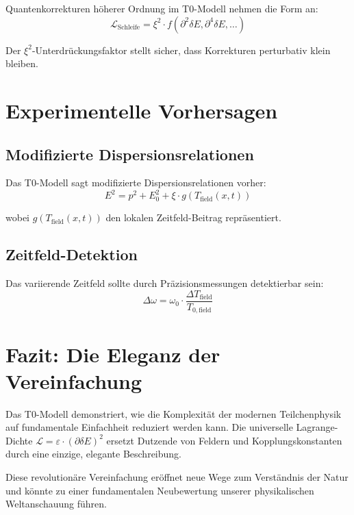 \documentclass[12pt,a4paper]{report}
\begin{document}
	Quantenkorrekturen höherer Ordnung im T0-Modell nehmen die Form an:
	\begin{equation}
		\mathcal{L}_{\text{Schleife}} = \xi^2 \cdot f(\partial^2\delta E, \partial^4\delta E, \ldots)
	\end{equation}
	
	Der $\xi^2$-Unterdrückungsfaktor stellt sicher, dass Korrekturen perturbativ klein bleiben.
	
	\section{Experimentelle Vorhersagen}
	
	\subsection{Modifizierte Dispersionsrelationen}
	
	Das T0-Modell sagt modifizierte Dispersionsrelationen vorher:
	\begin{equation}
		E^2 = p^2 + E_0^2 + \xi \cdot g(T_{\text{field}}(x,t))
	\end{equation}
	
	wobei $g(T_{\text{field}}(x,t))$ den lokalen Zeitfeld-Beitrag repräsentiert.
	
	\subsection{Zeitfeld-Detektion}
	
	Das variierende Zeitfeld sollte durch Präzisionsmessungen detektierbar sein:
	\begin{equation}
		\Delta\omega = \omega_0 \cdot \frac{\Delta T_{\text{field}}}{T_{0,\text{field}}}
	\end{equation}
	
	\section{Fazit: Die Eleganz der Vereinfachung}
	
	Das T0-Modell demonstriert, wie die Komplexität der modernen Teilchenphysik auf fundamentale Einfachheit reduziert werden kann. Die universelle Lagrange-Dichte $\mathcal{L} = \varepsilon \cdot (\partial\delta E)^2$ ersetzt Dutzende von Feldern und Kopplungskonstanten durch eine einzige, elegante Beschreibung.
	
	Diese revolutionäre Vereinfachung eröffnet neue Wege zum Verständnis der Natur und könnte zu einer fundamentalen Neubewertung unserer physikalischen Weltanschauung führen.
	
\end{document}
